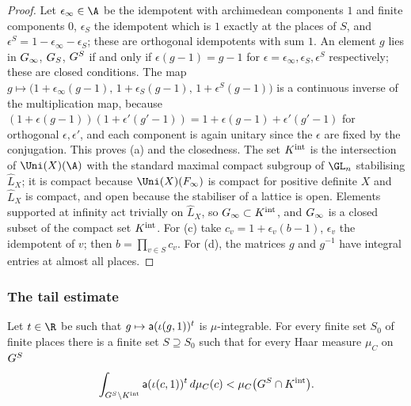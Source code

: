 \begin{proof}
Let $\epsilon_\infty\in\A$ be the idempotent with archimedean components $1$ and finite components $0$, $\epsilon_S$
the idempotent which is $1$ exactly at the places of $S$, and $\epsilon^S=1-\epsilon_\infty-\epsilon_S$; these are orthogonal
idempotents with sum $1$. An element $g$ lies in $G_\infty$, $G_S$, $G^{S}$ if and only if
$\epsilon(g-1)=g-1$ for $\epsilon=\epsilon_\infty,\epsilon_S,\epsilon^S$ respectively; these are closed conditions. The map
$g\mapsto\bigl(1+\epsilon_\infty(g-1),\,1+\epsilon_S(g-1),\,1+\epsilon^S(g-1)\bigr)$ is a continuous inverse of the multiplication map,
because $(1+\epsilon(g-1))(1+\epsilon'(g'-1))=1+\epsilon(g-1)+\epsilon'(g'-1)$ for orthogonal $\epsilon,\epsilon'$, and each component
is again unitary since the $\epsilon$ are fixed by the conjugation. This proves (a) and the closedness. The set
$K^{\mathrm{int}}$ is the intersection of $\Uni(X)(\A)$ with the standard maximal compact subgroup of
$\GL_n$ stabilising $\widehat L_X$; it is compact because $\Uni(X)(F_\infty)$ is compact for positive definite $X$
and $\widehat L_X$ is compact, and open because the stabiliser of a lattice is open. Elements supported at infinity act trivially on $\widehat L_X$,
so $G_\infty\subset K^{\mathrm{int}}$, and $G_\infty$ is a closed subset of the compact set $K^{\mathrm{int}}$. For (c) take
$c_v=1+\epsilon_v(b-1)$, $\epsilon_v$ the idempotent of $v$; then $b=\prod_{v\in S}c_v$. For (d), the matrices $g$ and $g^{-1}$
have integral entries at almost all places.
\end{proof}

\subsubsection*{The tail estimate}
\begin{lemma}[Tail]\label{pf:tlift:tail}
Let $t\in\R$ be such that $g\mapsto\mathsf{a}(\iota(g,1))^t$ is $\mu$-integrable. For every finite set $S_0$ of finite places
there is a finite set $S\supseteq S_0$ such that for every Haar measure $\mu_C$ on $G^{S}$
\begin{equation}\label{eq:tlift:tail}
  \int_{G^{S}\setminus K^{\mathrm{int}}}\mathsf{a}(\iota(c,1))^t\,d\mu_C(c)<\mu_C\bigl(G^{S}\cap K^{\mathrm{int}}\bigr).
\end{equation}
\end{lemma}

